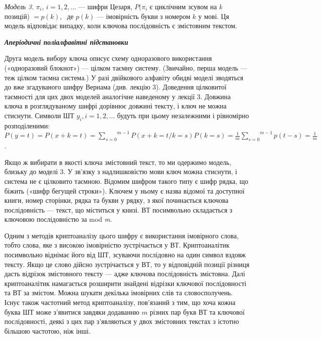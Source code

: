  \textit{Модель 3.  } $\pi _i$,  $i=1,2,\dots$ ---
шифри Цезаря,  $P(\pi _i$ є циклічним зсувом на \textit{k} позицій) 
$=p(k),\;$ де  $p(k)$ --- імовірність букви з номером  $k$ у мові. Ця
модель відповідає випадку, коли ключова послідовність є змістовним текстом. 


\bigskip

{\centering\bfseries\itshape
Аперіодичні поліалфавітні підстановки
\par}


\bigskip

Друга модель вибору ключа описує схему одноразового використання («одноразовий
блокнот») --- цілком таємну систему. (Звичайно, перша модель --- теж цілком таємна
система.) У разі двійкового алфавіту обидві моделі зводяться до вже згадуваного
шифру Вернама (див. лекцію 3). Доведення цілковитої таємності для цих двох
моделей аналогічне наведеному у лекції 3. Довжина ключа в розглядуваному шифрі
дорівнює довжині тексту, і ключ не можна стиснути. Символи ШТ 
$y_i,i=1,2,\dots$ будуть при цьому незалежними і
рівномірно розподіленими: 
${P(y=t)=P(x+k=t)=\overset{m-1}{\underset{s=0}{\sum
}}{P(x+k=t/k=s)P(k=s)}=\frac{1}{m}\overset{m-1}{\underset{s=0}{\sum
}}{p(t-s)=\frac{1}{m}}}$.

Якщо ж вибирати в якості ключа змістовний текст, то ми одержимо модель, близьку
до моделі 3. У зв’язку з надлишковістю мови ключ можна стиснути, і система не є
цілковито таємною. Відомим шифром такого типу є шифр рядка, що біжить («шифр
бегущей строки»). Ключем у ньому є назва відомої та доступної книги, номер
сторінки, рядка та букви у рядку, з якої починається ключова послідовність ---
текст, що міститься у книзі. ВТ посимвольно складається з ключовою
послідовністю за mod \textit{m}.

Одним з методів криптоаналізу цього шифру є використання імовірного слова, тобто
слова, яке з високою імовірністю зустрічається у ВТ. Криптоаналітик посимвольно
віднімає його від ШТ, зсуваючи послідовно на один символ вздовж тексту. Якщо це
слово дійсно зустрічається у ВТ, то у відповідній позиції різниця дасть
відрізок змістовного тексту --- адже ключова послідовність змістовна. Далі
криптоаналітик намагається розширити знайдені відрізки ключової послідовності
та ВТ за змістом. Можна шукати декілька імовірних слів та словосполучень. Існує
також частотний метод криптоаналізу, пов’язаний з тим, що хоча кожна буква ШТ
може з’явитися завдяки додаванню  $m$ різних пар букв ВТ та ключової
послідовності, деякі з цих пар з’являються у двох змістовних текстах з істотно
більшою частотою, ніж інші.

